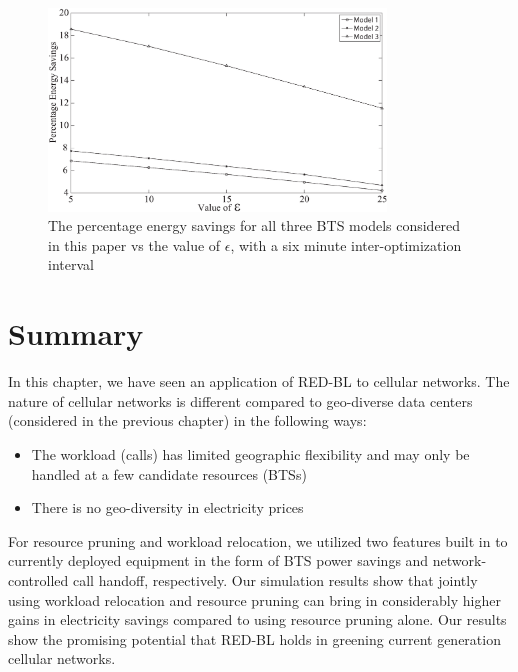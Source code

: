 \begin{figure}
\centering
\includegraphics[width=0.8\textwidth]{pics/ilyas7.eps}
\caption{The percentage energy savings for all three BTS models considered in this paper vs the value of $\epsilon$, with a six minute inter-optimization interval}
\label{fig:case2:results6}
\end{figure}

\section{Summary}
\label{sec:discuss:case2} In this chapter, we have seen an application of RED-BL to cellular networks. The nature of cellular networks is different compared to geo-diverse data centers (considered in the previous chapter) in the following ways:

\begin{itemize}
\item The workload (calls) has limited geographic flexibility and may only be handled at a few candidate resources (BTSs)
\item There is no geo-diversity in electricity prices
\end{itemize}

For resource pruning and workload relocation, we utilized two features built in to currently deployed equipment in the form of BTS power savings and network-controlled call handoff, respectively. Our simulation results show that jointly using workload relocation and resource pruning can bring in considerably higher gains in electricity savings compared to using resource pruning alone. Our results show the promising potential that RED-BL holds in greening current generation cellular networks.